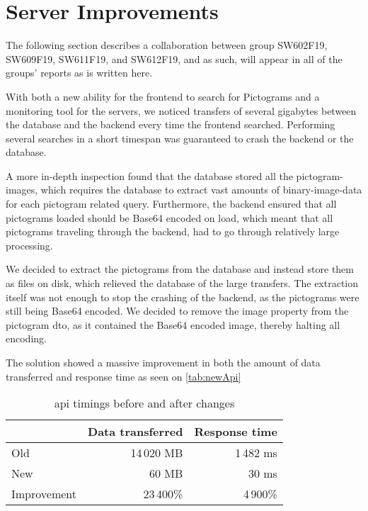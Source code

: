 \section{Server Improvements}

The following section describes a collaboration between group SW602F19, SW609F19, SW611F19, and SW612F19, and as such, will appear in all of the groups' reports as is written here.

With both a new ability for the frontend to search for Pictograms and a monitoring tool for the servers, we noticed transfers of several gigabytes between the database and the backend every time the frontend searched. Performing several searches in a short timespan was guaranteed to crash the backend or the database.

A more in-depth inspection found that the database stored all the pictogram-images, which requires the database to extract vast amounts of binary-image-data for each pictogram related query. Furthermore, the backend ensured that all pictograms loaded should be Base64 encoded on load, which meant that all pictograms traveling through the backend, had to go through relatively large processing.

We decided to extract the pictograms from the database and instead store them as files on disk, which relieved the database of the large transfers. The extraction itself was not enough to stop the crashing of the backend, as the pictograms were still being Base64 encoded. We decided to remove the image property from the pictogram \gls{dto}, as it contained the Base64 encoded image, thereby halting all encoding.

The solution showed a massive improvement in both the amount of data transferred and response time as seen on \autoref{tab:newApi}

\begin{table}[H]
    \centering
    \begin{tabular}{|l|r|r|}
    \hline
                    & Data transferred  & Response time \\ \hline
        Old         & 14\,020 MB         & 1\,482 ms      \\ \hline 
        New         & 60 MB             & 30 ms         \\ \hline
        Improvement & 23\,400\%          & 4\,900\%       \\ \hline
    \end{tabular}
    \caption{\gls{api} timings before and after changes}
    \label{tab:newApi}
\end{table}

